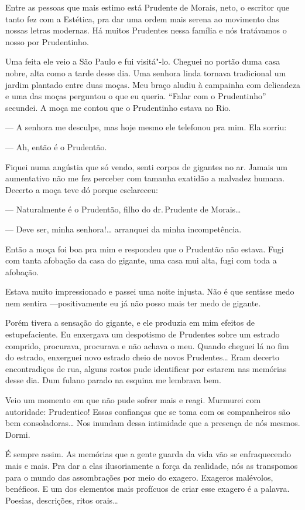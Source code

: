 Entre as pessoas que mais estimo está Prudente de Morais, neto, o
escritor que tanto fez com a Estética, pra dar uma ordem mais serena ao
movimento das nossas letras modernas. Há muitos Prudentes nessa família
e nós tratávamos o nosso por Prudentinho.

Uma feita ele veio a São Paulo e fui visitá"-lo. Cheguei no portão duma
casa nobre, alta como a tarde desse dia. Uma senhora linda tornava
tradicional um jardim plantado entre duas moças. Meu braço aludiu à
campainha com delicadeza e uma das moças perguntou o que eu queria.
``Falar com o Prudentinho'' secundei. A moça me contou que o Prudentinho
estava no Rio.

--- A senhora me desculpe, mas hoje mesmo ele telefonou pra mim. Ela
sorriu:

--- Ah, então é o Prudentão.

Fiquei numa angústia que só vendo, senti corpos de gigantes no ar.
Jamais um aumentativo não me fez perceber com tamanha exatidão a
malvadez humana. Decerto a moça teve dó porque esclareceu:

--- Naturalmente é o Prudentão, filho do dr.\,Prudente de Morais\ldots{}

--- Deve ser, minha senhora!\ldots{} arranquei da minha incompetência.

Então a moça foi boa pra mim e respondeu que o Prudentão não estava.
Fugi com tanta afobação da casa do gigante, uma casa mui alta, fugi com
toda a afobação.

Estava muito impressionado e passei uma noite injusta. Não é que
sentisse medo nem sentira ---positivamente eu já não posso mais ter medo
de gigante.

Porém tivera a sensação do gigante, e ele produzia em mim efeitos de
estupefaciente. Eu enxergava um despotismo de Prudentes sobre um estrado
comprido, procurava, procurava e não achava o meu. Quando cheguei lá no
fim do estrado, enxerguei novo estrado cheio de novos Prudentes\ldots{} Eram
decerto encontradiços de rua, alguns rostos pude identificar por estarem
nas memórias desse dia. Dum fulano parado na esquina me lembrava bem.

Veio um momento em que não pude sofrer mais e reagi. Murmurei com
autoridade: Prudentico! Essas confianças que se toma com os companheiros
são bem consoladoras\ldots{} Nos inundam dessa intimidade que a presença de
nós mesmos. Dormi.

É sempre assim. As memórias que a gente guarda da vida vão se
enfraquecendo mais e mais. Pra dar a elas ilusoriamente a força da
realidade, nós as transpomos para o mundo das assombrações por meio do
exagero. Exageros malévolos, benéficos. E um dos elementos mais
profícuos de criar esse exagero é a palavra. Poesias, descrições, ritos
orais\ldots{}

